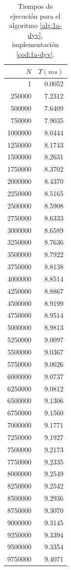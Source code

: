\begin{table}
	\footnotesize
	\centering
	\begin{tabular}{|r|r|}
		\hline
		$N$ & $T (ms)$ \\
		\hline
		1 & 0.0052 \\ 
		250000 & 7.2312 \\ 
		500000 & 7.6409 \\ 
		750000 & 7.9035 \\ 
		1000000 & 8.0444 \\ 
		1250000 & 8.1743 \\ 
		1500000 & 8.2631 \\ 
		1750000 & 8.3702 \\ 
		2000000 & 8.4370 \\ 
		2250000 & 8.5165 \\ 
		2500000 & 8.5908 \\ 
		2750000 & 8.6333 \\ 
		3000000 & 8.6589 \\ 
		3250000 & 8.7636 \\ 
		3500000 & 8.7922 \\ 
		3750000 & 8.8138 \\ 
		4000000 & 8.8514 \\ 
		4250000 & 8.8867 \\ 
		4500000 & 8.9199 \\ 
		4750000 & 8.9514 \\ 
		5000000 & 8.9813 \\ 
		5250000 & 9.0097 \\ 
		5500000 & 9.0367 \\ 
		5750000 & 9.0626 \\ 
		6000000 & 9.0737 \\ 
		6250000 & 9.0812 \\ 
		6500000 & 9.1306 \\ 
		6750000 & 9.1560 \\ 
		7000000 & 9.1771 \\ 
		7250000 & 9.1927 \\ 
		7500000 & 9.2173 \\ 
		7750000 & 9.2335 \\ 
		8000000 & 9.2549 \\ 
		8250000 & 9.2542 \\ 
		8500000 & 9.2936 \\ 
		8750000 & 9.3070 \\ 
		9000000 & 9.3145 \\ 
		9250000 & 9.3394 \\ 
		9500000 & 9.3354 \\ 
		9750000 & 9.4071 \\ 
		\hline
	\end{tabular}

    \caption{Tiempos de ejecución para el algoritmo \ref{alg:1a-dyv}, implementación \ref{cod:1a-dyv}.}
    \label{tab:1a-dyv}
\end{table}

